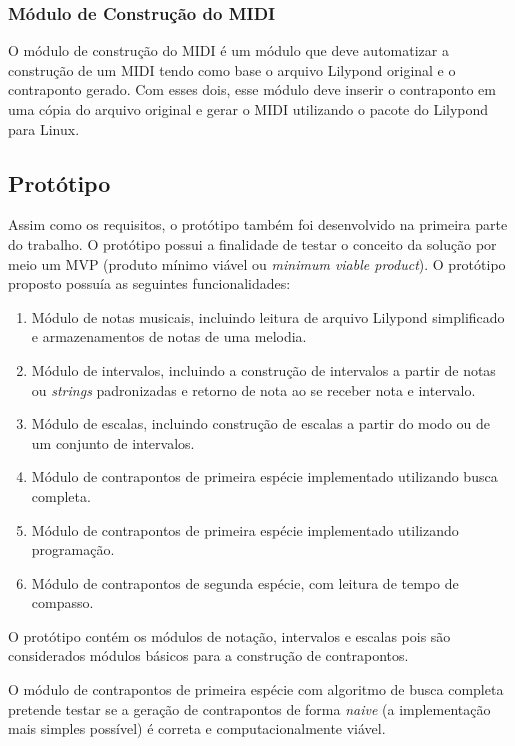     \subsubsection[Módulo de Construção do MIDI]{Módulo de Construção do MIDI}

      O módulo de construção do MIDI é um módulo que deve automatizar a construção de um MIDI tendo como base o arquivo Lilypond original e o contraponto gerado. Com esses dois, esse módulo deve inserir o contraponto em uma cópia do arquivo original e gerar o MIDI utilizando o pacote do Lilypond para Linux.

  \subsection[Protótipo]{Protótipo}

    Assim como os requisitos, o protótipo também foi desenvolvido na primeira parte do trabalho. O protótipo possui a finalidade de testar o conceito da solução por meio um MVP (produto mínimo viável ou \textit{minimum viable product}). O protótipo proposto possuía as seguintes funcionalidades:

    \begin{enumerate}
      \item Módulo de notas musicais, incluindo leitura de arquivo Lilypond simplificado e armazenamentos de notas de uma melodia.
      \item Módulo de intervalos, incluindo a construção de intervalos a partir de notas ou \textit{strings} padronizadas e retorno de nota ao se receber nota e intervalo.
      \item Módulo de escalas, incluindo construção de escalas a partir do modo ou de um conjunto de intervalos.
      \item Módulo de contrapontos de primeira espécie implementado utilizando busca completa.
      \item Módulo de contrapontos de primeira espécie implementado utilizando programação.
      \item Módulo de contrapontos de segunda espécie, com leitura de tempo de compasso.
    \end{enumerate}

    O protótipo contém os módulos de notação, intervalos e escalas pois são considerados módulos básicos para a construção de contrapontos.

    O módulo de contrapontos de primeira espécie com algoritmo de busca completa pretende testar se a geração de contrapontos de forma \textit{naive} (a implementação mais simples possível) é correta e computacionalmente viável.


